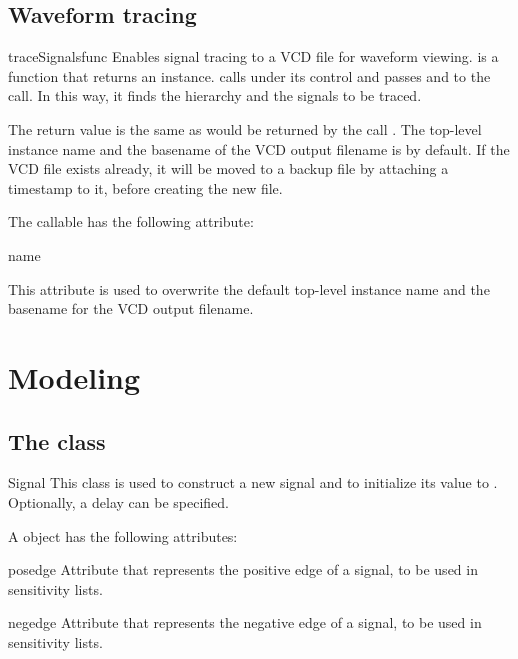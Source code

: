 \subsection{Waveform tracing\label{ref-trace}}


\begin{funcdesc}{traceSignals}{func  }
Enables signal tracing to a VCD file for waveform viewing.
 is a function that returns an instance.
 calls  under its control
and passes  and  to the call. In this way, it
finds the hierarchy and the signals to be traced.

The return value is the same as would be returned by the call
.  The top-level instance name and the
basename of the VCD output filename is  by
default.  If the VCD file exists already, it will be moved to a backup
file by attaching a timestamp to it, before creating the new file.
\end{funcdesc}

The  callable has the following attribute:

\begin{memberdesc}[traceSignals]{name}

This attribute is used to overwrite the default top-level instance
name and the basename for the VCD output filename.
\end{memberdesc}

\section{Modeling \label{ref-model}}

\subsection{The  class \label{ref-sig}}

\begin{classdesc}{Signal}{ }
This class is used to construct a new signal and to initialize its
value to . Optionally, a delay can be specified.
\end{classdesc}

A  object has the following attributes:

\begin{memberdesc}[Signal]{posedge}
Attribute that represents the positive edge of a signal, to be
used in sensitivity lists.
\end{memberdesc}
\begin{memberdesc}[Signal]{negedge}
Attribute that represents the negative edge of a signal, to be
used in sensitivity lists.
\end{memberdesc}

